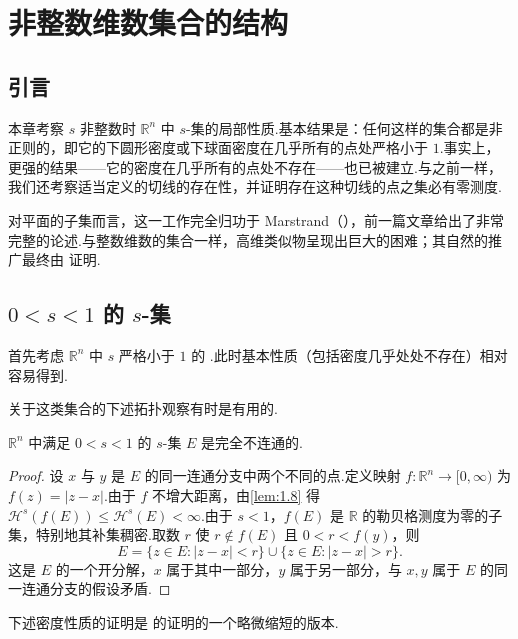 
\chapter{非整数维数集合的结构}\label{chap:4}

\section{引言}

本章考察 $s$ 非整数时 $\mathbb{R}^n$ 中 $s$-集的局部性质.基本结果是：任何这样的集合都是非正则的，即它的下圆形密度或下球面密度在几乎所有的点处严格小于 $1$.事实上，更强的结果——它的密度在几乎所有的点处不存在——也已被建立.与之前一样，我们还考察适当定义的切线的存在性，并证明存在这种切线的点之集必有零测度.

对平面的子集而言，这一工作完全归功于 Marstrand（\citeyear{marstrand1954a,marstrand1955}），前一篇文章给出了非常完整的论述.与整数维数的集合一样，高维类似物呈现出巨大的困难；其自然的推广最终由 \textcite{marstrand1964} 证明.

\section{\texorpdfstring{$0<s<1$ 的 $s$-集}{0<s<1 的 s-集}}

首先考虑 $\mathbb{R}^n$ 中 $s$ 严格小于 $1$ 的 .此时基本性质（包括密度几乎处处不存在）相对容易得到.

关于这类集合的下述拓扑观察有时是有用的.

\begin{lemma}\label{lem:4.1}
$\mathbb{R}^n$ 中满足 $0<s<1$ 的 $s$-集 $E$ 是完全不连通的.
\end{lemma}

\begin{proof}
设 $x$ 与 $y$ 是 $E$ 的同一连通分支中两个不同的点.定义映射 $f:\mathbb{R}^n\to[0,\infty)$ 为 $f(z)=|z-x|$.由于 $f$ 不增大距离，由\cref{lem:1.8} 得 $\mathcal{H}^s(f(E))\leq\mathcal{H}^s(E)<\infty$.由于 $s<1$，$f(E)$ 是 $\mathbb{R}$ 的勒贝格测度为零的子集，特别地其补集稠密.取数 $r$ 使 $r\notin f(E)$ 且 $0<r<f(y)$，则
\[
  E=\{z\in E:|z-x|<r\}\cup\{z\in E:|z-x|>r\}.
\]
这是 $E$ 的一个开分解，$x$ 属于其中一部分，$y$ 属于另一部分，与 $x,y$ 属于 $E$ 的同一连通分支的假设矛盾.
\end{proof}

下述密度性质的证明是 \textcite{marstrand1954a} 的证明的一个略微缩短的版本.


